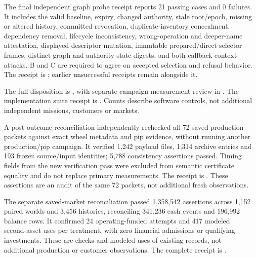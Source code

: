 
The final independent graph probe receipt reports 21 passing cases and 0 failures. It includes the valid baseline, expiry, changed authority, stale root/epoch, missing or altered history, committed revocation, duplicate-inventory concealment, dependency removal, lifecycle inconsistency, wrong-operation and deeper-name attestation, displayed descriptor mutation, immutable prepared/direct selector frames, distinct graph and authority state digests, and both callback-context attacks. B and C are required to agree on accepted selection and refusal behavior. The receipt is ; earlier unsuccessful receipts remain alongside it.

The full disposition is , with separate campaign measurement review in . The implementation suite receipt is . Counts describe software controls, not additional independent missions, customers or markets.


A post-outcome reconciliation independently rechecked all 72 saved production packets against exact wheel metadata and pip evidence, without running another production/pip campaign. It verified 1,242 payload files, 1,314 archive entries and 193 frozen source/input identities; 5,788 consistency assertions passed. Timing fields from the new verification pass were excluded from semantic certificate equality and do not replace primary measurements. The receipt is . These assertions are an audit of the same 72 packets, not additional fresh observations.


The separate saved-market reconciliation passed 1,358,542 assertions across 1,152 paired worlds and 3,456 histories, reconciling 341,236 cash events and 196,992 balance rows. It confirmed 24 operating-funded attempts and 417 modeled second-asset uses per treatment, with zero financial admissions or qualifying investments. These are checks and modeled uses of existing records, not additional production or customer observations. The complete receipt is .
